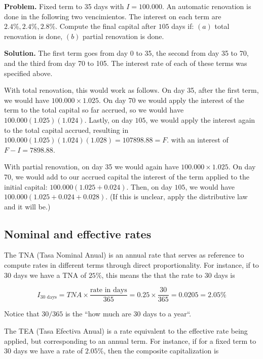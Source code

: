 \documentclass[a4paper, 12pt]{article}
\theoremstyle{definition}
\begin{document}
\begin{shaded}
    \textbf{Problem.} Fixed term to 35 days with $I = 100.000$. An automatic renovation is done in
    the following two vencimientos. The interest on each term are $2.4\%, 2.4\%,
    2.8\%$. Compute the final capital after $105$ days if: $(a)$ total
    renovation is done, $(b)$ partial renovation is done. 

    \textbf{Solution.} The first term goes from day $0$ to 35, the second from
    day 35 to 70, and the third from day 70 to 105. The interest rate of each of
    these terms was specified above.

    With total renovation, this would work as follows. On day 35, after the
    first term, we would have $100.000 \times 1.025$. On day 70 we would apply
    the interest of the term to the total capital so far accrued, so we would
    have $100.000(1.025)(1.024)$. Lastly, on day $105$, we would apply the
    interest again to the total capital accrued, resulting in
    $100.000(1.025)(1.024)(1.028) = 107898.88 = F$. with an interest of 
    $F - I = 7898.88$.

    With partial renovation, on day 35 we would again have $100.000 \times
    1.025$. On day 70, we would add to our accrued capital the interest of the
    term applied to the initial capital: $100.000(1.025 + 0.024)$. Then, on day
    $105$, we would have $100.000(1.025 + 0.024 + 0.028)$. (If this is unclear,
    apply the distributive law and it will be.)
\end{shaded}

\subsection{Nominal and effective rates}

The TNA (Tasa Nominal Anual) is an annual rate that serves as reference to compute rates in different
terms through direct proportionality. For instance, if to 30 days we have a TNA
of $25\%$, this means the that the rate to 30 days is 

\begin{equation*}
    I_{\text{30 days}} = TNA \times \frac{\text{rate in days}}{365} = 0.25
    \times \frac{30}{365} = 0.0205 = 2.05\%
\end{equation*}

Notice that $30 / 365$ is the ``how much are 30 days to a year``.

The TEA (Tasa Efectiva Anual) is a rate equivalent to the effective rate being
applied, but corresponding to an annual term. For instance, if for a fixed term
to 30 days we have a rate of $2.05\%$, then the composite capitalization is 
\end{document}
